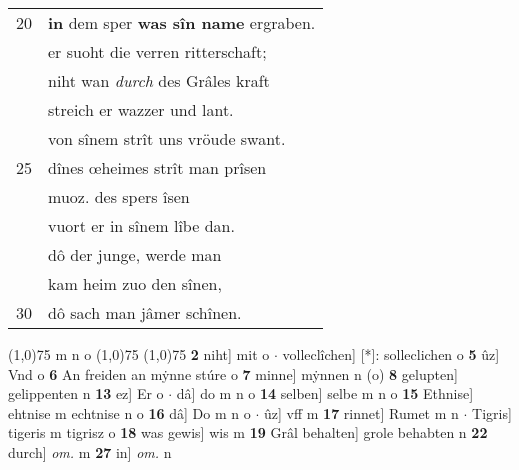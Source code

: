 \documentclass[8pt,a4paper,notitlepage]{article}
\begin{document}
\begin{table}[ht]
\begin{minipage}[t]{0.5\linewidth}
\begin{tabular}{rl}
20 & \textbf{in} dem sper \textbf{was sîn name} ergraben.\\ 
 & er suoht die verren ritterschaft;\\ 
 & niht wan \textit{durch} des Grâles kraft\\ 
 & streich er wazzer und lant.\\ 
 & von sînem strît uns vröude swant.\\ 
25 & dînes œheimes strît man prîsen\\ 
 & muoz. des spers îsen\\ 
 & vuort er in sînem lîbe dan.\\ 
 & dô der junge, werde man\\ 
 & kam heim zuo den sînen,\\ 
30 & dô sach man jâmer schînen.\\ 
\end{tabular}
\scriptsize
\line(1,0){75} \newline
m n o \newline
\line(1,0){75} \newline
\newline
\line(1,0){75} \newline
\textbf{2} niht] mit o  $\cdot$ volleclîchen] [*]: solleclichen o \textbf{5} ûz] Vnd o \textbf{6} An freiden an mẏnne stúre o \textbf{7} minne] mẏnnen n (o) \textbf{8} gelupten] gelippenten n \textbf{13} ez] Er o  $\cdot$ dâ] do m n o \textbf{14} selben] selbe m n o \textbf{15} Ethnise] ehtnise m echtnise n o \textbf{16} dâ] Do m n o  $\cdot$ ûz] vff m \textbf{17} rinnet] Rumet m n  $\cdot$ Tigris] tigeris m tigrisz o \textbf{18} was gewis] wis m \textbf{19} Grâl behalten] grole behabten n \textbf{22} durch] \textit{om.} m \textbf{27} in] \textit{om.} n \newline
\end{minipage}
\end{table}
\newpage
\end{document}
